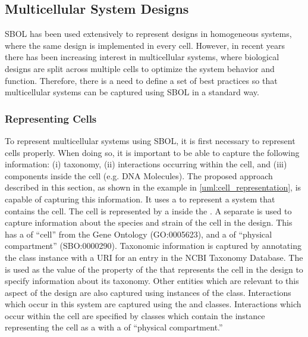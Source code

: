 \subsection{Multicellular System Designs}

SBOL has been used extensively to represent designs in homogeneous systems, where the same design is implemented in every cell. However, in recent years there has been increasing interest in multicellular systems, where biological designs are split across multiple cells to optimize the system behavior and function. Therefore, there is a need to define a set of best practices so that multicellular systems can be captured using SBOL in a standard way.

\subsubsection{Representing Cells}

To represent multicellular systems using SBOL, it is first necessary to represent cells properly. 
When doing so, it is important to be able to capture the following information: (i) taxonomy, (ii) interactions occurring within the cell, and (iii) components inside the cell (e.g. DNA Molecules). 
The proposed approach described in this section, as shown in the example in \ref{uml:cell_representation}, is capable of capturing this information. 
It uses a  to represent a system that contains the cell. 
The cell is represented by a  inside the . 
A separate  is used to capture information about the species and strain of the cell in the design. 
This  has a  of ``cell'' from the Gene Ontology (GO:0005623), and a  of ``physical compartment'' (SBO:0000290).
Taxonomic information is captured by annotating the class instance with a URI for an entry in the NCBI Taxonomy Database. 
The  is used as the value of the  property of the  that represents the cell in the design to specify information about its taxonomy. 
Other entities which are relevant to this aspect of the design are also captured using instances of the  class. 
Interactions which occur in this system are captured using the  and  classes. 
Interactions which occur within the cell are specified by  classes which contain the  instance representing the cell as a  with a  of ``physical compartment.''

